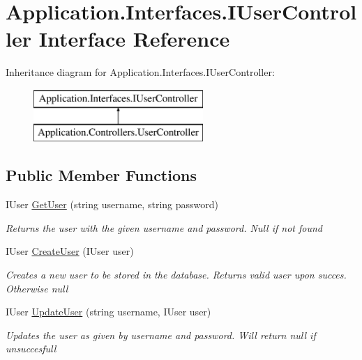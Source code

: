 \hypertarget{interface_application_1_1_interfaces_1_1_i_user_controller}{}\section{Application.\+Interfaces.\+I\+User\+Controller Interface Reference}
\label{interface_application_1_1_interfaces_1_1_i_user_controller}
Inheritance diagram for Application.\+Interfaces.\+I\+User\+Controller\+:\begin{figure}[H]
\begin{center}
\leavevmode
\includegraphics[height=2.000000cm]{interface_application_1_1_interfaces_1_1_i_user_controller}
\end{center}
\end{figure}
\subsection*{Public Member Functions}
\begin{DoxyCompactItemize}
\item 
I\+User \mbox{\hyperlink{interface_application_1_1_interfaces_1_1_i_user_controller_afdea9f68822192392d4b973e300f56af}{Get\+User}} (string username, string password)
\begin{DoxyCompactList}\small\item\em Returns the user with the given username and password. Null if not found \end{DoxyCompactList}\item 
I\+User \mbox{\hyperlink{interface_application_1_1_interfaces_1_1_i_user_controller_aca064ba3a4c3c2d0dd1339b8a4995e86}{Create\+User}} (I\+User user)
\begin{DoxyCompactList}\small\item\em Creates a new user to be stored in the database. Returns valid user upon succes. Otherwise null \end{DoxyCompactList}\item 
I\+User \mbox{\hyperlink{interface_application_1_1_interfaces_1_1_i_user_controller_a433f4021d60dafe735aff4d4b5536370}{Update\+User}} (string username, I\+User user)
\begin{DoxyCompactList}\small\item\em Updates the user as given by username and password. Will return null if unsuccesfull \end{DoxyCompactList}\end{DoxyCompactItemize}


